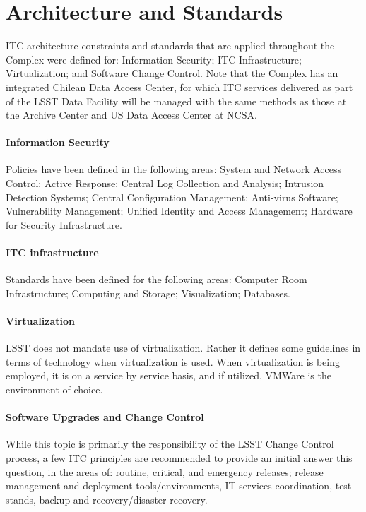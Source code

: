 \documentclass[11pt,twoside]{article}
\begin{document}

\section{Architecture and Standards}

ITC architecture constraints and standards that are applied throughout the Complex were defined for: Information Security; ITC Infrastructure; Virtualization; and Software Change Control.
Note that the Complex has an integrated Chilean Data Access Center, for which ITC services delivered as part of the LSST Data Facility will be managed with the same methods as those at the Archive Center and US Data Access Center at NCSA.

\paragraph*{Information Security} Policies have been defined in the following areas: System and Network Access Control; Active Response; Central Log Collection and Analysis; Intrusion Detection Systems; Central Configuration Management; Anti-virus Software; Vulnerability Management; Unified Identity and Access Management; Hardware for Security Infrastructure.

\paragraph*{ITC infrastructure} Standards have been defined for the following areas: Computer Room Infrastructure; Computing and Storage; Visualization; Databases.

\paragraph*{Virtualization} LSST does not mandate use of virtualization. Rather it defines some guidelines in terms of technology when virtualization is used. When virtualization is being employed, it is on a service by service basis, and if utilized, VMWare is the environment of choice.

\paragraph*{Software Upgrades and Change Control} While this topic is primarily the responsibility of the LSST Change Control process, a few ITC principles are recommended to provide an initial answer this question, in the areas of: routine, critical, and emergency releases; release management and deployment tools/environments, IT services coordination, test stands, backup and recovery/disaster recovery.
\end{document}
